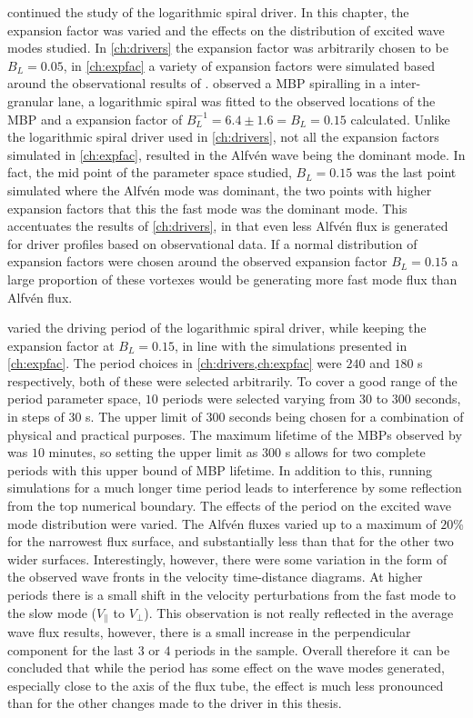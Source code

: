  continued the study of the logarithmic spiral driver.
In this chapter, the expansion factor was varied and the effects on the distribution of excited wave modes studied.
In \cref{ch:drivers} the expansion factor was arbitrarily chosen to be $B_L = 0.05$, in \cref{ch:expfac} a variety of expansion factors were simulated based around the observational results of \cite{bonet2008}.
\cite{bonet2008} observed a MBP spiralling in a inter-granular lane, a logarithmic spiral was fitted to the observed locations of the MBP and a expansion factor of $B_L^{-1} = 6.4 \pm 1.6 = B_L = 0.15$ calculated.
Unlike the logarithmic spiral driver used in \cref{ch:drivers}, not all the expansion factors simulated in \cref{ch:expfac}, resulted in the Alfv\'en wave being the dominant mode.
In fact, the mid point of the parameter space studied, $B_L = 0.15$ was the last point simulated where the Alfv\'en mode was dominant, the two points with higher expansion factors that this the fast mode was the dominant mode.
This accentuates the results of \cref{ch:drivers}, in that even less Alfv\'en flux is generated for driver profiles based on observational data.
If a normal distribution of expansion factors were chosen around the observed expansion factor $B_L = 0.15$ a large proportion of these vortexes would be generating more fast mode flux than Alfv\'en flux.

 varied the driving period of the logarithmic spiral driver, while keeping the expansion factor at $B_L = 0.15$, in line with the simulations presented in \cref{ch:expfac}.
The period choices in \cref{ch:drivers,ch:expfac} were $240$ and $180$ s respectively, both of these were selected arbitrarily.
To cover a good range of the period parameter space, $10$ periods were selected varying from $30$ to $300$ seconds, in steps of $30$ s.
The upper limit of $300$ seconds being chosen for a combination of physical and practical purposes.
The maximum lifetime of the MBPs observed by \cite{sanchezalmeida2004} was $10$ minutes, so setting the upper limit as $300$ s allows for two complete periods with this upper bound of MBP lifetime.
In addition to this, running simulations for a much longer time period leads to interference by some reflection from the top numerical boundary.
The effects of the period on the excited wave mode distribution were varied.
The Alfv\'en fluxes varied up to a maximum of $20$\% for the narrowest flux surface, and substantially less than that for the other two wider surfaces.
Interestingly, however, there were some variation in the form of the observed wave fronts in the velocity time-distance diagrams.
At higher periods there is a small shift in the velocity perturbations from the fast mode to the slow mode ($V_\parallel$ to $V_\perp$).
This observation is not really reflected in the average wave flux results, however, there is a small increase in the perpendicular component for the last $3$ or $4$ periods in the sample.
Overall therefore it can be concluded that while the period has some effect on the wave modes generated, especially close to the axis of the flux tube, the effect is much less pronounced than for the other changes made to the driver in this thesis.

